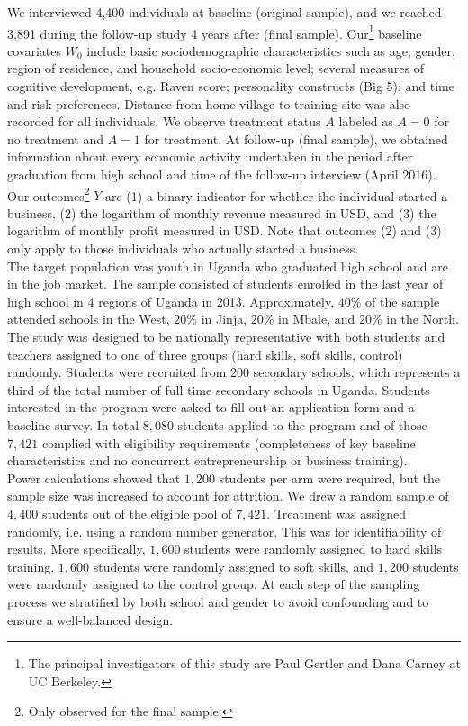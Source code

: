 We interviewed 4,400 individuals at baseline (original sample), and we reached 3,891 during the follow-up study 4 years after (final sample). Our\footnote{The principal investigators of this study are Paul Gertler and Dana Carney at UC Berkeley.} baseline covariates $W_0$ include basic sociodemographic characteristics such as age, gender, region of residence, and household socio-economic level; several measures of cognitive development, e.g. Raven score; personality constructs (Big 5); and time and risk preferences. Distance from home village to training site was also recorded for all individuals. We observe treatment status $A$ labeled as $A=0$ for no treatment and $A = 1$ for treatment. At follow-up (final sample), we obtained information about every economic activity undertaken in the period after graduation from high school and time of the follow-up interview (April 2016). Our outcomes\footnote{Only observed for the final sample.} $Y$ are (1) a binary indicator for whether the individual started a business, (2) the logarithm of monthly revenue measured in USD, and (3) the logarithm of monthly profit measured in USD. Note that outcomes (2) and (3) only apply to those individuals who actually started a business.\\

The target population was youth in Uganda who graduated high school and are in the job market. The sample consisted of students enrolled in the last year of high school in 4 regions of Uganda in 2013. Approximately, $40\%$ of the sample attended schools in the West, $20\%$ in Jinja, $20\%$ in Mbale, and $20\%$ in the North. The study was designed to be nationally representative with both students and teachers assigned to one of three groups (hard skills, soft skills, control) randomly. Students were recruited from $200$ secondary schools, which represents a third of the total number of full time secondary schools in Uganda. Students interested in the program were asked to fill out an application form and a baseline survey. In total $8,080$ students applied to the program and of those $7,421$ complied with eligibility requirements (completeness of key baseline characteristics and no concurrent entrepreneurship or business training). \\

Power calculations showed that $1,200$ students per arm were required, but the sample size was increased to account for attrition. We drew a random sample of $4,400$ students out of the eligible pool of $7,421$. Treatment was assigned randomly, i.e. using a random number generator. This was for identifiability of results. More specifically, $1,600$ students were randomly assigned to hard skills training, $1,600$ students were randomly assigned to soft skills, and $1,200$ students were randomly assigned to the control group. At each step of the sampling process we stratified by both school and gender to avoid confounding and to ensure a well-balanced design.\\

